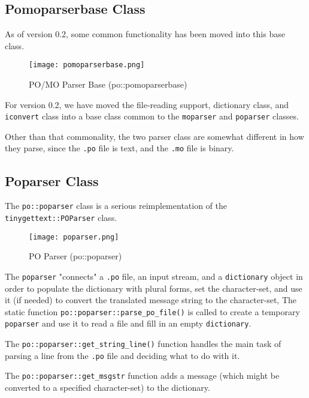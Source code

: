 \subsection{Pomoparserbase Class}
\label{subsec:potext_pomoparserbase_class}

   As of version 0.2, some common functionality has been moved into
   this base class.

\begin{figure}[H]
   \centering 
   \texttt{[image: pomoparserbase.png]}
   \caption{PO/MO Parser Base (po::pomoparserbase)}
   \label{fig:potext_pomoparserbase}
\end{figure}

   For version 0.2, we have moved the file-reading support, dictionary class,
   and \texttt{iconvert} class
   into a base class common to the \texttt{moparser} and
   \texttt{poparser} classes.

   Other than that commonality, the two parser class are somewhat different in
   how they parse, since the \texttt{.po} file is text, and
   the \texttt{.mo} file is binary.

\subsection{Poparser Class}
\label{subsec:potext_poparser_class}

   The \texttt{po::poparser} class is a serious reimplementation of the
   \texttt{tinygettext::POParser} class.

\begin{figure}[H]
   \centering 
   \texttt{[image: poparser.png]}
   \caption{PO Parser (po::poparser)}
   \label{fig:potext_poparser}
\end{figure}

   The \texttt{poparser} "connects" a \texttt{.po} file, an input stream,
   and a \texttt{dictionary} object in order to populate the dictionary with
   plural forms, set the character-set, and use it (if needed) to convert the
   translated message string to the character-set,
   The static function \texttt{po::poparser::parse\_po\_file()} is called to
   create a temporary \texttt{poparser} and use it to
   read a file and fill in an empty \texttt{dictionary}.

   The \texttt{po::poparser::get\_string\_line()} function handles the
   main task of parsing a line from the \texttt{.po} file and deciding
   what to do with it.

   The \texttt{po::poparser::get\_msgstr} function adds a message (which might
   be converted to a specified character-set) to the dictionary.

